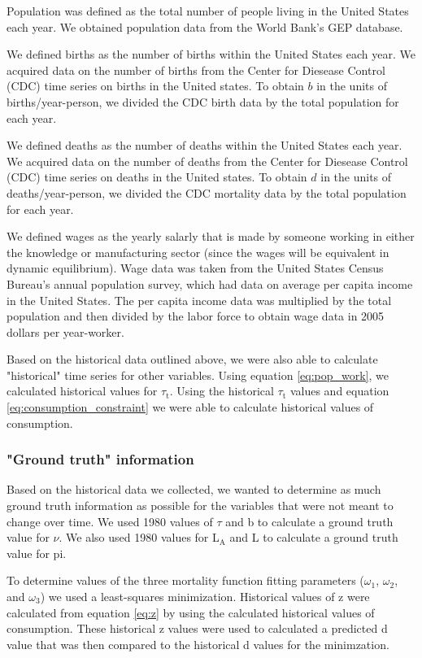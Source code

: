 \documentclass[letterpaper,12pt]{article}
\begin{document}
Population was defined as the total number of people living in the United States each year. We obtained population data from the World Bank's GEP database.

We defined births as the number of births within the United States each year. We acquired data on the number of births from the Center for Diesease Control (CDC) time series on births in the United states. To obtain $b$ in the units of births/year-person, we divided the CDC birth data by the total population for each year.

We defined deaths as the number of deaths within the United States each year. We acquired data on the number of deaths from the Center for Diesease Control (CDC) time series on deaths in the United states. To obtain $d$ in the units of deaths/year-person, we divided the CDC mortality data by the total population for each year.

We defined wages as the yearly salarly that is made by someone working in either the knowledge or manufacturing sector (since the wages will be equivalent in dynamic equilibrium). Wage data was taken from the United States Census Bureau's annual population survey, which had data on average per capita income in the United States. The per capita income data was multiplied by the total population and then divided by the labor force to obtain wage data in 2005 dollars per year-worker.

Based on the historical data outlined above, we were also able to calculate "historical" time series for other variables. Using equation \ref{eq:pop_work}, we calculated historical values for $\tau_\mathrm{t}$. Using the historical $\tau_\mathrm{t}$ values and equation \ref{eq:consumption_constraint} we were able to calculate historical values of consumption. 

\subsubsection{"Ground truth" information}
Based on the historical data we collected, we wanted to determine as much ground truth information as possible for the variables that were not meant to change over time. We used 1980 values of $\tau$ and b to calculate a ground truth value for $\nu$. We also used 1980 values for L$_\mathrm{A}$ and L to calculate a ground truth value for $\mathrm{pi}$.

To determine values of the three mortality function fitting parameters ($\omega_\mathrm{1}$, $\omega_\mathrm{2}$, and $\omega_\mathrm{3}$) we used a least-squares minimization. Historical values of z were calculated from equation \ref{eq:z} by using the calculated historical values of consumption. These historical z values were used to calculated a predicted d value that was then compared to the historical d values for the minimzation. 
\end{document}
